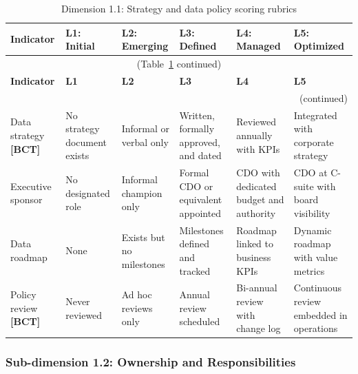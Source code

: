 \begin{center}
{\small
\begin{longtable}{|p{2.4cm}|p{2.0cm}|p{2.0cm}|p{2.2cm}|p{2.2cm}|p{2.2cm}|}
\caption{Dimension 1.1: Strategy and data policy scoring rubrics}\label{tab:d1-1}\\

\hline
\textbf{Indicator} & \textbf{L1: Initial} & \textbf{L2: Emerging} & \textbf{L3: Defined} & \textbf{L4: Managed} & \textbf{L5: Optimized} \\
\hline
\endfirsthead
\multicolumn{6}{c}{\small (Table~\ref{tab:d1-1} continued)} \\
\hline
\textbf{Indicator} & \textbf{L1} & \textbf{L2} & \textbf{L3} & \textbf{L4} & \textbf{L5} \\
\hline
\endhead
\hline
\multicolumn{6}{r}{\small (continued)} \\
\endfoot
\hline
\endlastfoot
Data strategy \textbf{[BCT]} &
  No strategy document exists &
  Informal or verbal only &
  Written, formally approved, and dated &
  Reviewed annually with KPIs &
  Integrated with corporate strategy \\
\hline
Executive sponsor &
  No designated role &
  Informal champion only &
  Formal CDO or equivalent appointed &
  CDO with dedicated budget and authority &
  CDO at C-suite with board visibility \\
\hline
Data roadmap &
  None &
  Exists but no milestones &
  Milestones defined and tracked &
  Roadmap linked to business KPIs &
  Dynamic roadmap with value metrics \\
\hline
Policy review \textbf{[BCT]} &
  Never reviewed &
  Ad hoc reviews only &
  Annual review scheduled &
  Bi-annual review with change log &
  Continuous review embedded in operations \\
\hline
\end{longtable}
}
\end{center}

\subsubsection*{Sub-dimension 1.2: Ownership and Responsibilities}

